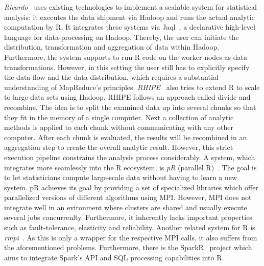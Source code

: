 {\em Ricardo}~\cite{das:2010a} uses existing technologies to implement a scalable system for statistical analysis: it executes the data shipment via Hadoop and runs the actual analytic computation by R. 
It integrates these systems via Jaql~\cite{beyer:2011a}, a declarative high-level language for data-processing on Hadoop. 
Thereby, the user can initiate the distribution, transformation and aggregation of data within Hadoop. 
Furthermore, the system supports to run R code on the worker nodes as data transformations. 
However, in this setting the user still has to explicitly specify the data-flow and the data distribution, which requires a substantial understanding of MapReduce's principles. 
{\em RHIPE}~\cite{guha:s2012a} also tries to extend R to scale to large data sets using Hadoop. 
RHIPE follows an approach called divide and recombine. 
The idea is to split the examined data up into several chunks so that they fit in the memory of a single computer. 
Next a collection of analytic methods is applied to each chunk without communicating with any other computer. 
After each chunk is evaluated, the results will be recombined in an aggregation step to create the overall analytic result. 
However, this strict execution pipeline constrains the analysis process considerably. 
A system, which integrates more seamlessly into the R ecosystem, is {\em pR} (parallel R)~\cite{samatova:2009a}. 
The goal is to let statisticians compute large-scale data without having to learn a new system. 
pR achieves its goal by providing a set of specialized libraries which offer parallelized versions of different algorithms using MPI.
However, MPI does not integrate well in an evironment where clusters are shared and usually execute several jobs concurrenlty. 
Furthermore, it inherently lacks important properties such as fault-tolerance, elasticity and reliability. 
Another related system for R is {\em rmpi}~\cite{rmpi}. 
As this is only a wrapper for the respective MPI calls, it also suffers from the aforementioned problems. 
Furthermore, there is the SparkR~\cite{Venkataraman2016} project which aims to integrate Spark's API and SQL processing capabilities into R. 

